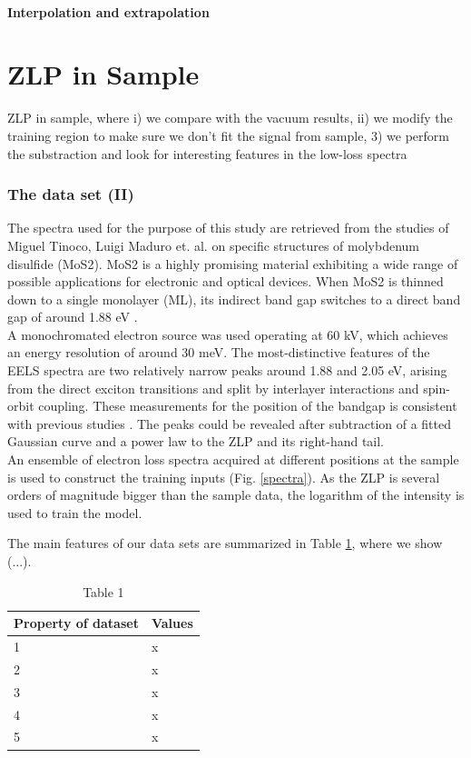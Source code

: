\documentclass[11pt,a4paper]{article}
\numberwithin{equation}{section}
\numberwithin{figure}{section}
\numberwithin{table}{section}
\begin{document}
\subsection{Interpolation and extrapolation}


\newpage
\part{ZLP in Sample}

ZLP in sample, where i) we compare with the vacuum results, ii) we modify the training region to make sure we don't fit the signal from sample, 3) we perform the substraction and look for interesting features in the low-loss spectra

\section{The data set (II)}

The spectra used for the purpose of this study are retrieved from the studies of Miguel Tinoco, Luigi Maduro et. al. \cite{soniamos2} on specific structures of molybdenum disulfide (MoS2). MoS2 is a highly promising material exhibiting a wide range of possible applications for electronic and optical devices. When MoS2 is thinned down to a single monolayer (ML), its indirect band gap switches to a direct band gap of around 1.88 eV \cite{nerl}. \\
A monochromated electron source was used operating at 60 kV, which achieves an energy resolution of around 30 meV. The most-distinctive features of the EELS spectra are two relatively narrow peaks around 1.88 and 2.05 eV, arising from the direct exciton transitions and split by interlayer interactions and spin-orbit coupling. These measurements for the position of the bandgap is consistent with previous studies \cite{nerl, komsa}. The peaks could be revealed after subtraction of a fitted Gaussian curve and a power law to the ZLP and its right-hand tail. \\

An ensemble of electron loss spectra acquired at different positions at the sample is used to construct the training inputs (Fig. \ref{spectra}). As the ZLP is several orders of magnitude bigger than the sample data, the logarithm of the intensity is used to train the model.

The main features of our data sets are summarized in Table \ref{table:spectra}, where we show (...). 

\begin{table}[H]
\centering
\begin{tabular}{|l|l|}
\hline
Property of dataset & Values \\ \hline
1                   & x      \\ \hline
2                   & x      \\ \hline
3                   & x      \\ \hline
4                   & x      \\ \hline
5                   & x      \\ \hline
\end{tabular}
\caption{Table 1}
\label{table:spectra}
\end{table}
\end{document}

